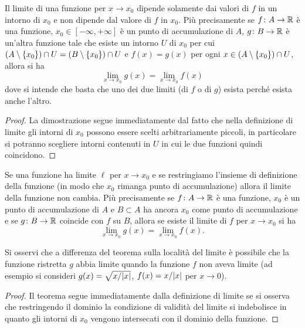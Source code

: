 \begin{theorem}
Il limite di una funzione per $x\to x_0$ dipende solamente dai valori di $f$
in un intorno di $x_0$ e non dipende dal valore di $f$ in $x_0$.
Più precisamente se $f\colon A \to \mathbb R$ è una funzione,
$x_0\in[-\infty,+\infty]$ è un punto di accumulazione di $A$,
$g\colon B\to \mathbb R$ è un'altra funzione tale che esiste un intorno $U$ di $x_0$
per cui $(A\setminus{\left\{ x_0 \right\}})\cap U = (B\setminus{\left\{ x_0 \right\}})\cap U$ e $f(x)=g(x)$ per ogni
$x\in (A\setminus{\left\{ x_0 \right\}})\cap U$,
allora si ha
\[
  \lim_{x\to x_0} g(x) = \lim_{x\to x_0} f(x)
\]
dove si intende che basta che uno dei due limiti (di $f$ o di $g$) esista
perché esista anche l'altro.
\end{theorem}
%
\begin{proof}
La dimostrazione segue immediatamente dal fatto che nella definizione di limite
gli intorni di $x_0$
possono essere scelti arbitrariamente piccoli, in particolare si potranno scegliere intorni contenuti in $U$ in cui le due funzioni quindi coincidono.
\end{proof}

\begin{theorem}
Se una funzione ha limite $\ell$ per $x\to x_0$ e se restringiamo l'insieme di definizione della funzione (in modo che $x_0$ rimanga punto di accumulazione) allora il limite della funzione non cambia. Più precisamente
se $f\colon A \to \mathbb R$ è una funzione, $x_0$ è un punto di accumulazione di $A$
e $B\subset A$ ha ancora $x_0$ come punto di accumulazione e se $g\colon B\to \mathbb R$ coincide con $f$ su $B$, allora se esiste il limite di $f$ per $x\to x_0$
si ha
\[
  \lim_{x\to x_0} g(x) = \lim_{x\to x_0} f(x).
\]
\end{theorem}

Si osservi che a differenza del teorema sulla località del limite è
possibile che la funzione ristretta $g$ abbia limite quando la funzione
$f$ non aveva limite (ad esempio si consideri $g(x)=\sqrt{x/{\left|x\right|}}$, $f(x) = x/{\left|x\right|}$ per $x\to 0$).

\begin{proof}
Il teorema segue immediatamente dalla definizione di limite se si osserva
che restringendo il dominio la condizione di validità del limite si indebolisce
in quanto gli intorni di $x_0$ vengono intersecati con il dominio della funzione.
\end{proof}

